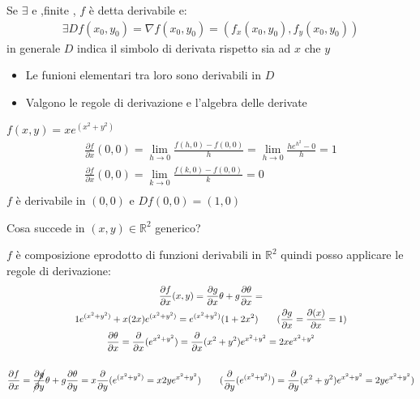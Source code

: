 \documentclass[a4paper, oneside]{article}
\begin{document}
    \begin{definition}
        Se $\exists$ \fbox{*} e \fbox{**},finite , $f$ è detta derivabile e:
        \begin{gather*}
            \exists D f(x_0,y_0) = \nabla f(x_0,y_0) = (f_x(x_0,y_0),f_y (x_0,y_0))
        \end{gather*}
        in generale $D$ indica il simbolo di derivata rispetto sia ad $x$ che $y$
    \end{definition}

    \begin{observation}
    \begin{itemize}
        \item Le funioni elementari tra loro sono derivabili in $D$
        \item Valgono le regole di derivazione e l'algebra delle derivate
    \end{itemize}
    \end{observation}

    \begin{example}
        $f(x,y) = x e^{(x^2+y^2)}$
        \begin{gather*}
            \frac{\partial f}{\partial x} (0,0) = \lim_{h \to 0} \frac{f(h,0)-f(0,0)}{h} =  \lim_{h \to 0} \frac{h e^{h^2}-0}{h} = 1\\
            \frac{\partial f}{\partial x} (0,0) = \lim_{k \to 0} \frac{f(k,0)-f(0,0)}{k} = 0\\
        \end{gather*}
        $f$ è derivabile in $(0,0)$ e $Df(0,0) = (1,0)$
    \end{example}
    Cosa succede in $(x,y) \in \mathbb{R}^2$ generico?
    \begin{observation}
        $f$ è composizione eprodotto di funzioni derivabili in $\mathbb{R}^2$ quindi posso applicare le regole di derivazione:
        \begin{gather*}
            \frac{\partial f}{\partial x} (x,y) = \frac{\partial g}{\partial x} \theta + g\frac{\partial \theta}{\partial x}=\\
            1 e^{(x^2+y^2)} + x(2x)e^{(x^2+y^2)} = e^{(x^2+y^2)}(1+2x^2) \qquad (\frac{\partial g}{\partial x} = \frac{\partial(x)}{\partial x} = 1)\\
            \frac{ \partial \theta}{\partial x} = \frac{\partial}{\partial x}(e^{x^2+y^2}) = \frac{\partial }{\partial x}(x^2+y^2) e^{x^2+y^2}=2x e^{x^2+y^2}\\\\
            \frac{\partial f}{\partial x}= \cancel{\frac{\partial g}{\partial y}}\theta + g\frac{\partial \theta}{\partial y} = x \frac{\partial}{\partial y}(e^{(x^2+y^2)}=x2ye^{x^2+y^2}) \qquad (\frac{\partial}{\partial y}(e^{(x^2+y^2)})= \frac{\partial}{\partial y}(x^2+y^2)e^{x^2+y^2}= 2y e^{x^2+y^2})
        \end{gather*}            
    \end{observation}
\end{document}
